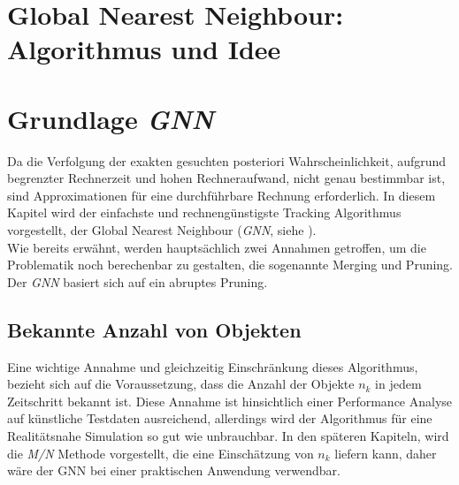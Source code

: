 \documentclass[10pt,a4paper]{article}
\begin{document}
\section{Global Nearest Neighbour: Algorithmus und Idee}
\section{Grundlage \textit{GNN}}
Da die Verfolgung der exakten gesuchten posteriori Wahrscheinlichkeit, aufgrund begrenzter Rechnerzeit und hohen Rechneraufwand, nicht genau bestimmbar ist, sind Approximationen für eine durchführbare Rechnung erforderlich. In diesem Kapitel wird der einfachste und rechnengünstigste Tracking Algorithmus vorgestellt, der Global Nearest Neighbour (\textit{GNN}, siehe \cite{MOT}).\\
Wie bereits erwähnt, werden hauptsächlich zwei Annahmen getroffen, um die Problematik noch berechenbar zu gestalten, die sogenannte Merging und Pruning. Der \textit{GNN} basiert sich auf ein abruptes Pruning.
\subsection{Bekannte Anzahl von Objekten}
Eine wichtige Annahme und gleichzeitig Einschränkung dieses Algorithmus, bezieht sich auf die Voraussetzung, dass die Anzahl der Objekte $n_k$ in jedem Zeitschritt bekannt ist. Diese Annahme ist hinsichtlich einer Performance Analyse auf künstliche Testdaten ausreichend, allerdings wird der Algorithmus für eine Realitätsnahe Simulation so gut wie unbrauchbar. In den späteren Kapiteln, wird die \textit{M/N} Methode vorgestellt, die eine Einschätzung von $n_k$ liefern kann, daher wäre der GNN bei einer praktischen Anwendung verwendbar.
\end{document}

